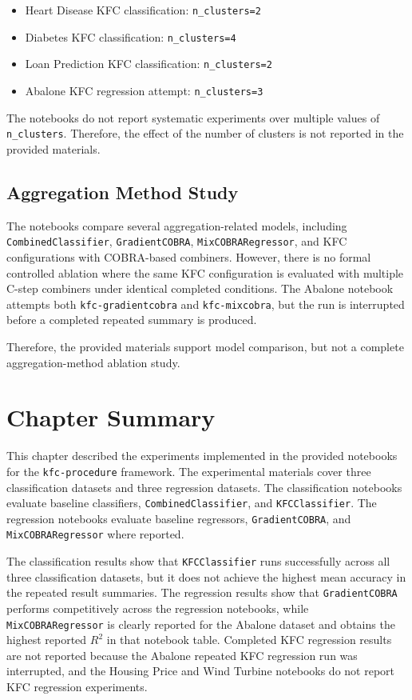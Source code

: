 \begin{itemize}
    \item Heart Disease KFC classification: \texttt{n\_clusters=2}
    \item Diabetes KFC classification: \texttt{n\_clusters=4}
    \item Loan Prediction KFC classification: \texttt{n\_clusters=2}
    \item Abalone KFC regression attempt: \texttt{n\_clusters=3}
\end{itemize}

The notebooks do not report systematic experiments over multiple values of \texttt{n\_clusters}. Therefore, the effect of the number of clusters is not reported in the provided materials.

\subsection{Aggregation Method Study}

The notebooks compare several aggregation-related models, including \texttt{CombinedClassifier}, \texttt{GradientCOBRA}, \texttt{MixCOBRARegressor}, and KFC configurations with COBRA-based combiners. However, there is no formal controlled ablation where the same KFC configuration is evaluated with multiple C-step combiners under identical completed conditions. The Abalone notebook attempts both \texttt{kfc-gradientcobra} and \texttt{kfc-mixcobra}, but the run is interrupted before a completed repeated summary is produced.

Therefore, the provided materials support model comparison, but not a complete aggregation-method ablation study.

\section{Chapter Summary}
\label{sec:chapter_summary_results}

This chapter described the experiments implemented in the provided notebooks for the \texttt{kfc-procedure} framework. The experimental materials cover three classification datasets and three regression datasets. The classification notebooks evaluate baseline classifiers, \texttt{CombinedClassifier}, and \texttt{KFCClassifier}. The regression notebooks evaluate baseline regressors, \texttt{GradientCOBRA}, and \texttt{MixCOBRARegressor} where reported.

The classification results show that \texttt{KFCClassifier} runs successfully across all three classification datasets, but it does not achieve the highest mean accuracy in the repeated result summaries. The regression results show that \texttt{GradientCOBRA} performs competitively across the regression notebooks, while \texttt{MixCOBRARegressor} is clearly reported for the Abalone dataset and obtains the highest reported $R^2$ in that notebook table. Completed KFC regression results are not reported because the Abalone repeated KFC regression run was interrupted, and the Housing Price and Wind Turbine notebooks do not report KFC regression experiments.

